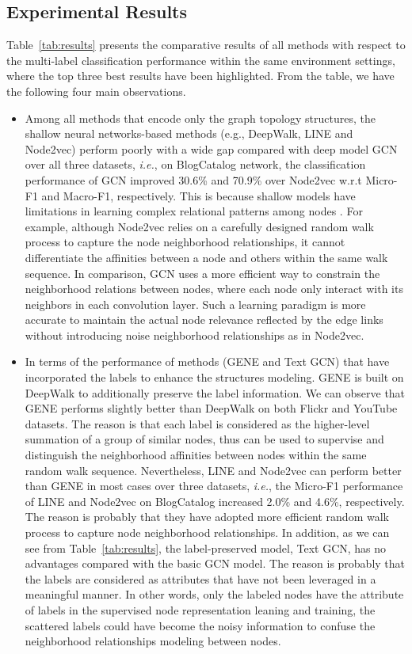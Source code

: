 \documentclass[conference]{IEEEtran}
\begin{document}
\subsection{Experimental Results}
Table~\ref{tab:results} presents the comparative results of all methods with respect to the multi-label classification performance within the same environment settings, where the top three best results have been highlighted. From the table, we have the following four main observations.
\begin{itemize}
    \item Among all methods that encode only the graph topology structures, the shallow neural networks-based methods (e.g., DeepWalk, LINE and Node2vec) perform poorly with a wide gap compared with deep model GCN over all three datasets, \textit{i.e.}, on BlogCatalog network, the classification performance of GCN improved 30.6\% and 70.9\% over Node2vec w.r.t Micro-F1 and Macro-F1, respectively. This is because shallow models have limitations in learning complex relational patterns among nodes \cite{zhang2018network}. For example, although Node2vec relies on a carefully designed random walk process to capture the node neighborhood relationships, it cannot differentiate the affinities between a node and others within the same walk sequence. In comparison, GCN uses a more efficient way to constrain the neighborhood relations between nodes, where each node only interact with its neighbors in each convolution layer. Such a learning paradigm is more accurate to maintain the actual node relevance reflected by the edge links without introducing noise neighborhood relationships as in Node2vec.
    \item In terms of the performance of methods (GENE and Text GCN) that have incorporated the labels to enhance the structures modeling. GENE is built on DeepWalk to additionally preserve the label information. We can observe that GENE performs slightly better than DeepWalk on both Flickr and YouTube datasets. The reason is that each label is considered as the higher-level summation of a group of similar nodes, thus can be used to supervise and distinguish the neighborhood affinities between nodes within the same random walk sequence. Nevertheless, LINE and Node2vec can perform better than GENE in most cases over three datasets, \textit{i.e.}, the Micro-F1 performance of LINE and Node2vec on BlogCatalog increased 2.0\% and 4.6\%, respectively. The reason is probably that they have adopted more efficient random walk process to capture node neighborhood relationships. In addition, as we can see from Table~\ref{tab:results}, the label-preserved model, Text GCN, has no advantages compared with the basic GCN model. The reason is probably that the labels are considered as attributes that have not been leveraged in a meaningful manner. In other words, only the labeled nodes have the attribute of labels in the supervised node representation leaning and training, the scattered labels could have become the noisy information to confuse the neighborhood relationships modeling between nodes.


\end{itemize}
\end{document}
